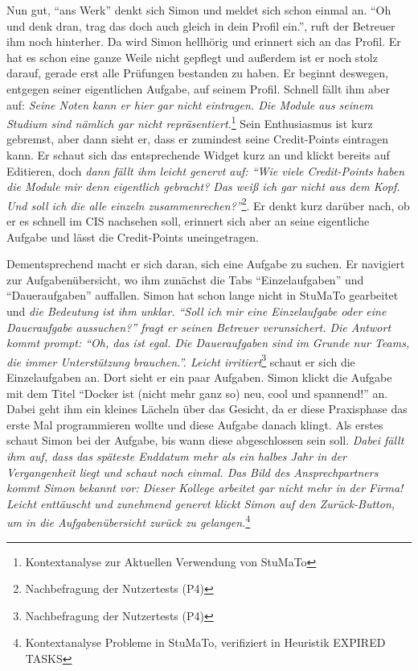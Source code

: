 \documentclass[
  12pt,
  ngerman,
  a4paper,
]{article}
\begin{document}
Nun gut, ``ans Werk'' denkt sich Simon und meldet sich schon einmal an.
``Oh und denk dran, trag das doch auch gleich in dein Profil ein.'',
ruft der Betreuer ihm noch hinterher. Da wird Simon hellhörig und
erinnert sich an das Profil. Er hat es schon eine ganze Weile nicht
gepflegt und außerdem ist er noch stolz darauf, gerade erst alle
Prüfungen bestanden zu haben. Er beginnt deswegen, entgegen seiner
eigentlichen Aufgabe, auf seinem Profil. Schnell fällt ihm aber auf:
\emph{Seine Noten kann er hier gar nicht eintragen. Die Module aus
seinem Studium sind nämlich gar nicht repräsentiert.}\footnote{Kontextanalyse
  zur Aktuellen Verwendung von StuMaTo} Sein Enthusiasmus ist kurz
gebremst, aber dann sieht er, dass er zumindest seine Credit-Points
eintragen kann. Er schaut sich das entsprechende Widget kurz an und
klickt bereits auf Editieren, doch \emph{dann fällt ihm leicht genervt
auf: ``Wie viele Credit-Points haben die Module mir denn eigentlich
gebracht? Das weiß ich gar nicht aus dem Kopf. Und soll ich die alle
einzeln zusammenrechen?''}\footnote{Nachbefragung der Nutzertests (P4)}.
Er denkt kurz darüber nach, ob er es schnell im CIS nachsehen soll,
erinnert sich aber an seine eigentliche Aufgabe und lässt die
Credit-Points uneingetragen.

Dementsprechend macht er sich daran, sich eine Aufgabe zu suchen. Er
navigiert zur Aufgabenübersicht, wo ihm zunächst die Tabs
``Einzelaufgaben'' und ``Daueraufgaben'' auffallen. Simon hat schon
lange nicht in StuMaTo gearbeitet und \emph{die Bedeutung ist ihm
unklar. ``Soll ich mir eine Einzelaufgabe oder eine Daueraufgabe
aussuchen?'' fragt er seinen Betreuer verunsichert. Die Antwort kommt
prompt: ``Oh, das ist egal. Die Daueraufgaben sind im Grunde nur Teams,
die immer Unterstützung brauchen.''. Leicht irritiert}\footnote{Nachbefragung
  der Nutzertests (P4)} schaut er sich die Einzelaufgaben an. Dort sieht
er ein paar Aufgaben. Simon klickt die Aufgabe mit dem Titel ``Docker
ist (nicht mehr ganz so) neu, cool und spannend!'' an. Dabei geht ihm
ein kleines Lächeln über das Gesicht, da er diese Praxisphase das erste
Mal programmieren wollte und diese Aufgabe danach klingt. Als erstes
schaut Simon bei der Aufgabe, bis wann diese abgeschlossen sein soll.
\emph{Dabei fällt ihm auf, dass das späteste Enddatum mehr als ein
halbes Jahr in der Vergangenheit liegt und schaut noch einmal. Das Bild
des Ansprechpartners kommt Simon bekannt vor: Dieser Kollege arbeitet
gar nicht mehr in der Firma! Leicht enttäuscht und zunehmend genervt
klickt Simon auf den Zurück-Button, um in die Aufgabenübersicht zurück
zu gelangen.}\footnote{Kontextanalyse Probleme in StuMaTo, verifiziert
  in Heuristik EXPIRED TASKS}
\end{document}
